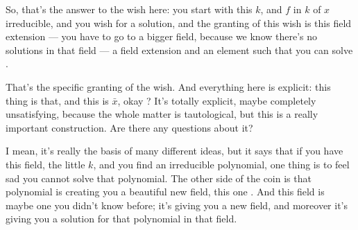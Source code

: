 \begin{speech}[01:15:23 - 01:17:00]
So, that's the answer to the wish here: you start with this $k$, and $f$ in $k$ of $x$ irreducible, and you wish for a solution, and the granting of this wish is this field extension --- you have to go to a bigger field, because we know there's no solutions in that field --- a field extension and an element such that you can solve .

That's the specific granting of the wish. And everything here is explicit: this thing is that, and this is $\bar{x}$, okay ? It's totally explicit, maybe completely unsatisfying, because the whole matter is tautological, but this is a really important construction. Are there any questions about it?

I mean, it's really the basis of many different ideas, but it says that if you have this field, the little $k$, and you find an irreducible polynomial, one thing is to feel sad you cannot solve that polynomial. The other side of the coin is that polynomial is creating you a beautiful new field, this one . And this field is maybe one you didn't know before; it's giving you a new field, and moreover it's giving you a solution for that polynomial in that field.
\end{speech}


